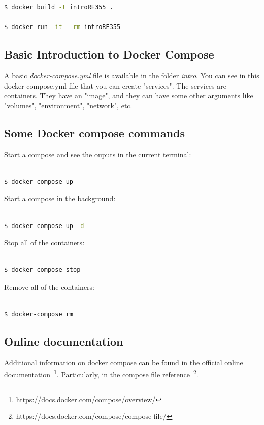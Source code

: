 \documentclass[a4paper,11pt]{exam}
\begin{document}
\begin{lstlisting}[frame=single,language={sh}]
$ docker build -t introRE355 .

$ docker run -it --rm introRE355
\end{lstlisting}	

\subsection{Basic Introduction to Docker Compose}

A basic \textit{docker-compose.yml} file is available in the folder \textit{intro}. You can see in this docker-compose.yml file that you can create "services". The services are containers. They have an "image", and they can have some other arguments like "volumes", "environment", "network", etc.

\subsection{Some Docker compose commands}

Start a compose and see the ouputs in the current terminal:

\begin{lstlisting}[frame=single,language={sh}]  % Start your code-block
	
$ docker-compose up
\end{lstlisting}

Start a compose in the background:

\begin{lstlisting}[frame=single,language={sh}]  % Start your code-block
	
$ docker-compose up -d
\end{lstlisting}

Stop all of the containers:

\begin{lstlisting}[frame=single,language={sh}]  % Start your code-block

$ docker-compose stop
\end{lstlisting}

Remove all of the containers:

\begin{lstlisting}[frame=single,language={sh}]  % Start your code-block

$ docker-compose rm
\end{lstlisting}


\subsection{Online documentation}
Additional information on docker compose can be found in the official online documentation~\footnote{https://docs.docker.com/compose/overview/}. Particularly,  in the compose file reference~\footnote{https://docs.docker.com/compose/compose-file/}.
\end{document}
